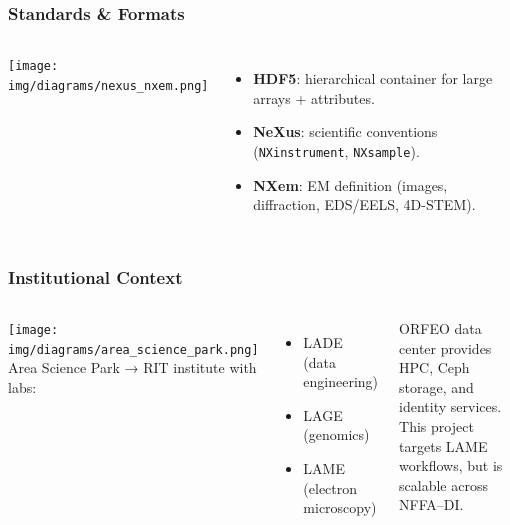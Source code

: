 \documentclass{beamer}
\begin{document}
	\begin{frame}
		\frametitle{Standards \& Formats}
		\begin{columns}
			\texttt{[image: img/diagrams/nexus\_nxem.png]}
			\begin{itemize}
				\item \textbf{HDF5}: hierarchical container for large arrays + attributes.
				\item \textbf{NeXus}: scientific conventions (\texttt{NXinstrument}, \texttt{NXsample}).
				\item \textbf{NXem}: EM definition (images, diffraction, EDS/EELS, 4D-STEM).
			\end{itemize}
		\end{columns}
	\end{frame}
	
	\begin{frame}
		\frametitle{Institutional Context}
		\begin{columns}
			\column{0.5\textwidth}
			\texttt{[image: img/diagrams/area\_science\_park.png]}
			\column{0.5\textwidth}
			Area Science Park → RIT institute with labs:  
			\begin{itemize}
				\item LADE (data engineering)  
				\item LAGE (genomics)  
				\item LAME (electron microscopy)  
			\end{itemize}
			\medskip
			ORFEO data center provides HPC, Ceph storage, and identity services.  
			\medskip
			This project targets LAME workflows, but is scalable across NFFA–DI.
		\end{columns}
	\end{frame}
\end{document}
